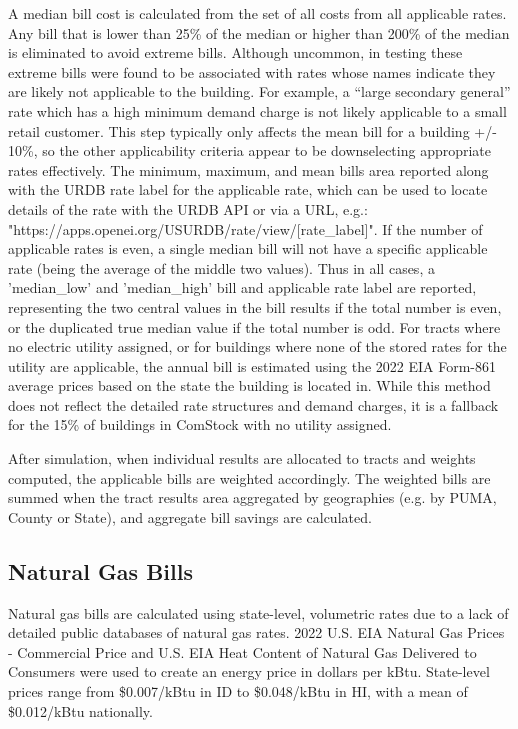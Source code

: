 A median bill cost is calculated from the set of all costs from all applicable rates. Any bill that is lower than 25\% of the median or higher than 200\% of the median is eliminated to avoid extreme bills. Although uncommon, in testing these extreme bills were found to be associated with rates whose names indicate they are likely not applicable to the building. For example, a ``large secondary general'' rate which has a high minimum demand charge is not likely applicable to a small retail customer. This step typically only affects the mean bill for a building +/- 10\%, so the other applicability criteria appear to be downselecting appropriate rates effectively. The minimum, maximum, and mean bills area reported along with the URDB rate label for the applicable rate, which can be used to locate details of the rate with the URDB API or via a URL, e.g.: "https://apps.openei.org/USURDB/rate/view/[rate_label]". If the number of applicable rates is even, a single median bill will not have a specific applicable rate (being the average of the middle two values). Thus in all cases, a 'median_low' and 'median_high' bill and applicable rate label are reported, representing the two central values in the bill results if the total number is even, or the duplicated true median value if the total number is odd.
For tracts where no electric utility assigned, or for buildings where none of the stored rates for the utility are applicable, the annual bill is estimated using the 2022 EIA Form-861 \citep{eia_electricity} average prices based on the state the building is located in. While this method does not reflect the detailed rate structures and demand charges, it is a fallback for the 15\% of buildings in ComStock with no utility assigned.

After simulation, when individual results are allocated to tracts and weights computed, the applicable bills are weighted accordingly. The weighted bills are summed when the tract results area aggregated by geographies (e.g. by PUMA, County or State), and aggregate bill savings are calculated. 

\subsection{Natural Gas Bills}
Natural gas bills are calculated using state-level, volumetric rates due to a lack of detailed public databases of natural gas rates. 2022 U.S. EIA Natural Gas Prices - Commercial Price and U.S. EIA Heat Content of Natural Gas Delivered to Consumers \citep{eia_natural_gas} were used to create an energy price in dollars per kBtu. State-level prices range from \$0.007/kBtu in ID to \$0.048/kBtu in HI, with a mean of \$0.012/kBtu nationally.

